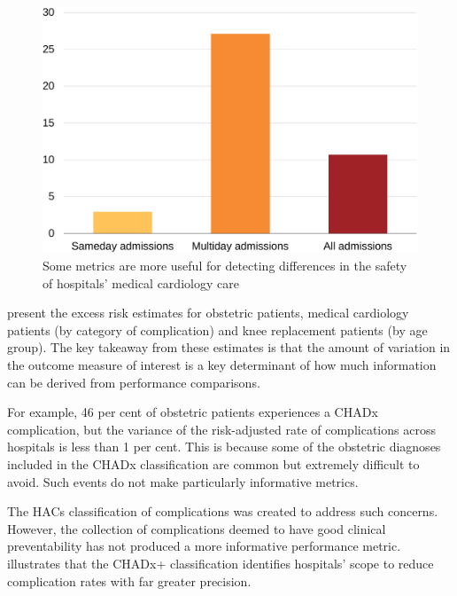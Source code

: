 \documentclass[submission]{grattan}
\begin{document}
\begin{figure}[!t]
\caption{Some metrics are more useful for detecting differences in the safety of hospitals' medical cardiology care}\label{fig:some-metrics-are-more-useful-for-detecting-differences-in-safety-of-hospitals-medical-cardiology-care}

\includegraphics[page=30]{atlas/comps_charts.pdf}

\end{figure}


 present the excess risk estimates for obstetric patients, medical cardiology patients (by category of complication) and knee replacement patients (by age group).
The key takeaway from these estimates is that the amount of variation in the outcome measure of interest is a key determinant of how much information can be derived from performance comparisons.

For example, 46 per cent of obstetric patients experiences a CHADx complication, but the variance of the risk-adjusted rate of complications across hospitals is less than 1 per cent.
This is because some of the obstetric diagnoses included in the CHADx classification are common but extremely difficult to avoid.
Such events do not make particularly informative metrics.

The HACs classification of complications was created to address such concerns.
However, the collection of complications deemed to have good clinical preventability has not produced a more informative performance metric.  illustrates that the CHADx+ classification identifies hospitals' scope to reduce complication rates with far greater precision.
\end{document}

